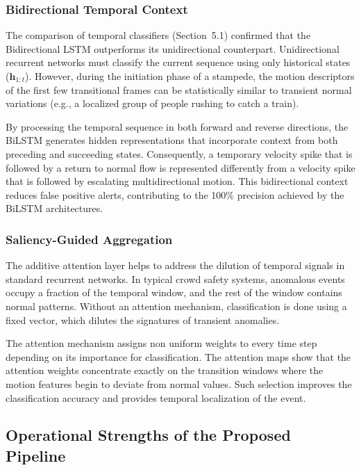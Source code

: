 \subsubsection{Bidirectional Temporal Context}
The comparison of temporal classifiers (Section~5.1) confirmed that the Bidirectional LSTM outperforms its unidirectional counterpart. Unidirectional recurrent networks must classify the current sequence using only historical states ($\mathbf{h}_{1:t}$). However, during the initiation phase of a stampede, the motion descriptors of the first few transitional frames can be statistically similar to transient normal variations (e.g., a localized group of people rushing to catch a train). 

By processing the temporal sequence in both forward and reverse directions, the BiLSTM generates hidden representations that incorporate context from both preceding and succeeding states. Consequently, a temporary velocity spike that is followed by a return to normal flow is represented differently from a velocity spike that is followed by escalating multidirectional motion. This bidirectional context reduces false positive alerts, contributing to the 100\% precision achieved by the BiLSTM architectures.

\subsubsection{Saliency-Guided Aggregation}
The additive attention layer helps to address the dilution of temporal signals in standard recurrent networks. In typical crowd safety systems, anomalous events occupy a fraction of the temporal window, and the rest of the window contains normal patterns. Without an attention mechanism, classification is done using a fixed vector, which dilutes the signatures of transient anomalies.

The attention mechanism assigns non uniform weights to every time step depending on its importance for classification. The attention maps show that the attention weights concentrate exactly on the transition windows where the motion features begin to deviate from normal values. Such selection improves the classification accuracy and provides temporal localization of the event.

\subsection{Operational Strengths of the Proposed Pipeline}

